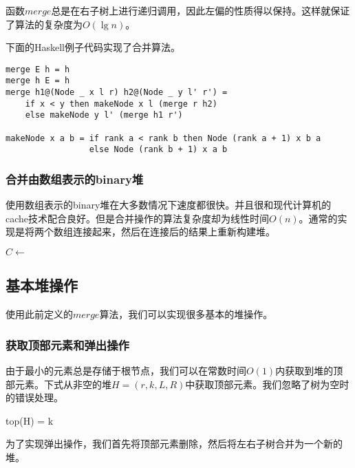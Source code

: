 \documentclass[UTF8]{article}
\begin{document}
函数$merge$总是在右子树上进行递归调用，因此左偏的性质得以保持。这样就保证了算法的复杂度为$O(\lg n)$。

下面的Haskell例子代码实现了合并算法。

\lstset{language=Haskell}
\begin{lstlisting}
merge E h = h
merge h E = h
merge h1@(Node _ x l r) h2@(Node _ y l' r') =
    if x < y then makeNode x l (merge r h2)
    else makeNode y l' (merge h1 r')

makeNode x a b = if rank a < rank b then Node (rank a + 1) x b a
                 else Node (rank b + 1) x a b
\end{lstlisting}

\subsubsection{合并由数组表示的binary堆}

使用数组表示的binary堆在大多数情况下速度都很快。并且很和现代计算机的cache技术配合良好。但是合并操作的算法复杂度却为线性时间$O(n)$。通常的实现是将两个数组连接起来，然后在连接后的结果上重新构建堆\cite{NIST}。

\begin{algorithmic}[1]
  \State $C \gets$ 
  \State {}
\EndFunction
\end{algorithmic}

\subsection{基本堆操作}

使用此前定义的$merge$算法，我们可以实现很多基本的堆操作。

\subsubsection{获取顶部元素和弹出操作}

由于最小的元素总是存储于根节点，我们可以在常数时间$O(1)$内获取到堆的顶部元素。下式从非空的堆$H = (r, k, L, R)$中获取顶部元素。我们忽略了树为空时的错误处理。

\be
top(H) = k
\ee

为了实现弹出操作，我们首先将顶部元素删除，然后将左右子树合并为一个新的堆。
\end{document}
